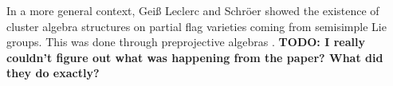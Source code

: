 \documentclass{article}
\begin{document}
In a more general context, Gei{\ss} Leclerc and Schr\"oer showed the existence of
cluster algebra structures on partial flag varieties coming from semisimple Lie groups.
This was done through preprojective algebras \cite{GeissLeclercSchroer2008PFvar}.
\textbf{TODO: I really couldn't figure out what was happening from the paper? What did
	they do exactly?}



\end{document}
